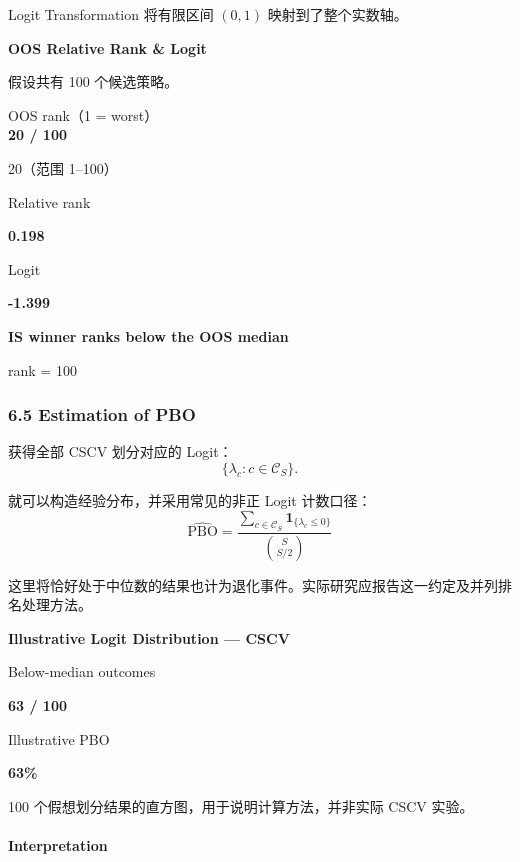 Logit Transformation 将有限区间 \((0,1)\) 映射到了整个实数轴。

\textbf{OOS Relative Rank \& Logit}

假设共有 100 个候选策略。

OOS rank（1 = worst）\\
\textbf{20 / 100}

20（范围 1--100）


Relative rank

\textbf{0.198}

Logit

\textbf{-1.399}

\textbf{IS winner ranks below the OOS median}

rank = 100


\hypertarget{part-4-71-0001-estimation-of-pbo}{%
\subsubsection{6.5 Estimation of PBO}\label{part-4-71-0001-estimation-of-pbo}}

获得全部 CSCV 划分对应的 Logit：
\[\{\lambda_c:c\in\mathcal C_S\}.\]

就可以构造经验分布，并采用常见的非正 Logit 计数口径：
\[\boxed{
\widehat{\mathrm{PBO}}
=
\frac{
\sum_{c\in\mathcal C_S}
\mathbf 1_{\{\lambda_c\leq0\}}
}{
\binom S{S/2}
}
}\]

这里将恰好处于中位数的结果也计为退化事件。实际研究应报告这一约定及并列排名处理方法。

\textbf{Illustrative Logit Distribution --- CSCV}


Below-median outcomes

\textbf{63 / 100}

Illustrative PBO

\textbf{63\%}

100 个假想划分结果的直方图，用于说明计算方法，并非实际 CSCV 实验。

\hypertarget{part-4-71-0001-interpretation-1}{%
\paragraph{Interpretation}\label{part-4-71-0001-interpretation-1}}

